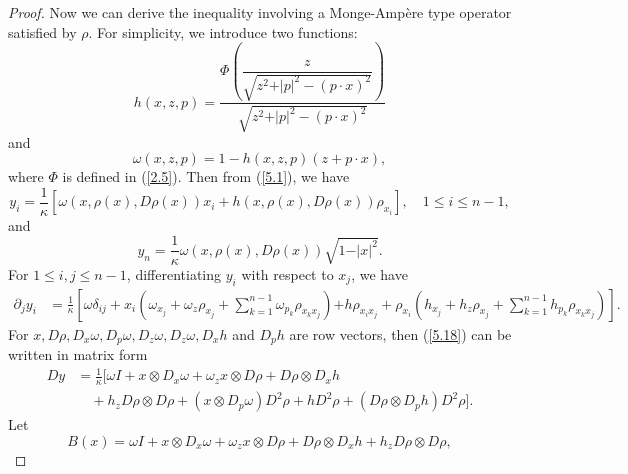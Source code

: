 \documentclass[a4paper,12pt,]{article}
\numberwithin{equation}{section}
\numberwithin{equation}{section} \allowdisplaybreaks
\begin{document}
\begin{proof}
  Now we can derive the inequality involving a Monge-Amp\`ere type operator satisfied by $\rho$. For simplicity, we introduce two functions:
  \begin{equation}\label{5.14}
    h(x,z,p) = \frac{\Phi\left(\dfrac{z}{\sqrt{z^{2}+\vert p \vert^{2}-(p \cdot x)^{2}}}\right)}{\sqrt{z^{2}+\vert p \vert^{2}-(p \cdot x)^{2}}}
  \end{equation}
  and
  \begin{equation}\label{5.15}
   \omega(x,z,p) = 1 - h(x,z,p)(z + p \cdot x),
  \end{equation}
  where $\Phi$ is defined in (\ref{2.5}). Then from (\ref{5.1}), we have
  \begin{equation}\label{5.16}
    y_{i} = \frac{1}{\kappa}\left[\omega(x,\rho(x),D\rho(x))x_{i} + h(x,\rho(x),D\rho(x))\rho_{x_{i}}\right], \quad 1 \leq i \leq n-1,
  \end{equation}
  and
  \begin{equation}\label{5.17}
    y_{n} = \frac{1}{\kappa} \omega(x,\rho(x),D\rho(x)) \sqrt{1 - \vert x \vert^{2}}.
  \end{equation}
  For $1 \leq i,j \leq n-1$, differentiating $y_{i}$ with respect to $x_{j}$, we have
  \begin{equation}\label{5.18}
    \begin{aligned}
    \partial_{j}y_{i} & = \frac{1}{\kappa}\left[\omega \delta_{ij} + x_{i}(\omega_{x_{j}} + \omega_{z} \rho_{x_{j}} + \sum_{k = 1}^{n-1}\omega_{p_{k}} \rho_{x_{k}x_{j}})\right.  
      \left. + h \rho_{x_{i}x_{j}} + \rho_{x_{i}}(h_{x_{j}} + h_{z} \rho_{x_{j}} + \sum_{k=1}^{n-1} h_{p_{k}} \rho_{x_{k}x_{j}})\right].
    \end{aligned}
  \end{equation}
  For $x, D\rho, D_{x}\omega, D_{p}\omega, D_{z}\omega, D_{z}\omega, D_{x}h$ and $D_{p}h$ are row vectors, then (\ref{5.18}) can be written in matrix form
  \begin{equation}\label{5.19}
    \begin{aligned}
    Dy & = \frac{1}{\kappa}[\omega I + x \otimes D_{x}\omega + \omega_{z}x \otimes D\rho + D\rho \otimes D_{x}h  \\
    & \quad + h_{z}D\rho \otimes D\rho + (x \otimes D_{p}\omega)D^{2}\rho + hD^{2}\rho + (D\rho \otimes D_{p}h)D^{2}\rho].
    \end{aligned}
  \end{equation}
  Let
  \begin{equation}\label{5.20}
    B(x) = \omega I + x \otimes D_{x}\omega + \omega_{z}x \otimes D\rho + D\rho \otimes D_{x}h + h_{z}D\rho \otimes D\rho,

\end{equation}
\end{proof}
\end{document}
